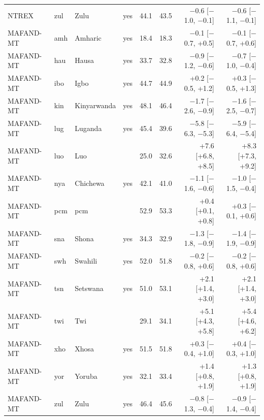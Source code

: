{\begin{longtable}{@{}lllcrrrr@{}}
NTREX & zul & Zulu & yes & 44.1 & 43.5 & $-$0.6 [$-$1.0, $-$0.1] & $-$0.6 [$-$1.1, $-$0.1] \\
MAFAND-MT & amh & Amharic & yes & 18.4 & 18.3 & $-$0.1 [$-$0.7, +0.5] & $-$0.1 [$-$0.7, +0.6] \\
MAFAND-MT & hau & Hausa & yes & 33.7 & 32.8 & $-$0.9 [$-$1.2, $-$0.6] & $-$0.7 [$-$1.0, $-$0.4] \\
MAFAND-MT & ibo & Igbo & yes & 44.7 & 44.9 & +0.2 [$-$0.5, +1.2] & +0.3 [$-$0.5, +1.3] \\
MAFAND-MT & kin & Kinyarwanda & yes & 48.1 & 46.4 & $-$1.7 [$-$2.6, $-$0.9] & $-$1.6 [$-$2.5, $-$0.7] \\
MAFAND-MT & lug & Luganda & yes & 45.4 & 39.6 & $-$5.8 [$-$6.3, $-$5.3] & $-$5.9 [$-$6.4, $-$5.4] \\
MAFAND-MT & luo & Luo &  & 25.0 & 32.6 & +7.6 [+6.8, +8.5] & +8.3 [+7.3, +9.2] \\
MAFAND-MT & nya & Chichewa & yes & 42.1 & 41.0 & $-$1.1 [$-$1.6, $-$0.6] & $-$1.0 [$-$1.5, $-$0.4] \\
MAFAND-MT & pcm & pcm &  & 52.9 & 53.3 & +0.4 [+0.1, +0.8] & +0.3 [$-$0.1, +0.6] \\
MAFAND-MT & sna & Shona & yes & 34.3 & 32.9 & $-$1.3 [$-$1.8, $-$0.9] & $-$1.4 [$-$1.9, $-$0.9] \\
MAFAND-MT & swh & Swahili & yes & 52.0 & 51.8 & $-$0.2 [$-$0.8, +0.6] & $-$0.2 [$-$0.8, +0.6] \\
MAFAND-MT & tsn & Setswana & yes & 51.0 & 53.1 & +2.1 [+1.4, +3.0] & +2.1 [+1.4, +3.0] \\
MAFAND-MT & twi & Twi &  & 29.1 & 34.1 & +5.1 [+4.3, +5.8] & +5.4 [+4.6, +6.2] \\
MAFAND-MT & xho & Xhosa & yes & 51.5 & 51.8 & +0.3 [$-$0.4, +1.0] & +0.4 [$-$0.3, +1.0] \\
MAFAND-MT & yor & Yoruba & yes & 32.1 & 33.4 & +1.4 [+0.8, +1.9] & +1.3 [+0.8, +1.9] \\
MAFAND-MT & zul & Zulu & yes & 46.4 & 45.6 & $-$0.8 [$-$1.3, $-$0.4] & $-$0.9 [$-$1.4, $-$0.4] \\
\end{longtable}}
